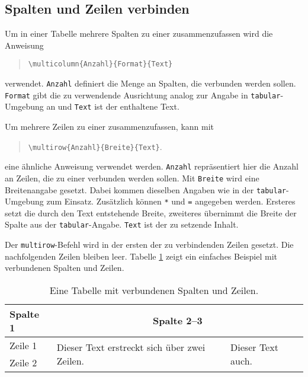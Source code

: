 \subsection{Spalten und Zeilen verbinden}

Um in einer Tabelle mehrere Spalten zu einer zusammenzufassen wird die Anweisung
%
\begin{quote}
	\verb!\multicolumn{Anzahl}{Format}{Text}!
\end{quote}
%
verwendet. \texttt{Anzahl} definiert die Menge an Spalten, die verbunden
werden sollen. \texttt{Format} gibt die zu verwendende Ausrichtung analog zur
Angabe in \texttt{tabular}-Umgebung an und \texttt{Text} ist der enthaltene
Text.

Um mehrere Zeilen zu einer zusammenzufassen, kann mit
%
\begin{quote}
	\verb!\multirow{Anzahl}{Breite}{Text}!.
\end{quote}
%
eine ähnliche Anweisung verwendet werden. \texttt{Anzahl} repräsentiert hier
die Anzahl an Zeilen, die zu einer verbunden werden sollen. Mit
\texttt{Breite} wird eine Breitenangabe gesetzt. Dabei kommen dieselben
Angaben wie in der \texttt{tabular}-Umgebung zum Einsatz. Zusätzlich können
\texttt{*} und \texttt{=} angegeben werden. Ersteres setzt die durch den Text
entstehende Breite, zweiteres übernimmt die Breite der Spalte aus der
\texttt{tabular}-Angabe. \texttt{Text} ist der zu setzende Inhalt.

Der \verb|multirow|-Befehl wird in der ersten der zu verbindenden Zeilen
gesetzt. Die nachfolgenden Zeilen bleiben leer. Tabelle
\ref{tab:multi-column-row-tabelle} zeigt ein einfaches Beispiel mit
verbundenen Spalten und Zeilen.

\begin{table}
	\caption{Eine Tabelle mit verbundenen Spalten und Zeilen.}
	\label{tab:multi-column-row-tabelle}
	\centering
	\setlength{\tabcolsep}{10pt} %
	\def\arraystretch{1.25}      %
	\begin{tabular}{@{}lll@{}}
		\toprule
		Spalte 1 & \multicolumn{2}{c}{Spalte 2--3} \\
		\midrule
		Zeile 1  & 
		\multirow{2}{4cm}{Dieser Text erstreckt sich über zwei Zeilen.} &
		\multirow{2}{*}{Dieser Text auch.} \\
	    Zeile 2  & & \\
		\bottomrule
	\end{tabular}
\end{table}


